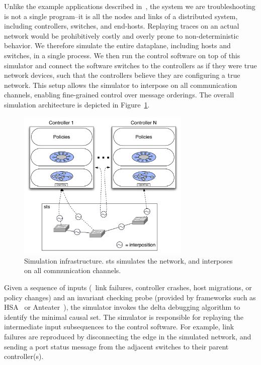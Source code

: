 Unlike the example applications described
in~\cite{Zeller:2002:SIF:506201.506206}, the system we are troubleshooting is not a
single program--it is all the nodes and links of a distributed system,
including controllers, switches, and end-hosts. Replaying traces
on an actual network would be prohibitively costly and overly prone to
non-deterministic behavior. We therefore simulate the entire dataplane, including hosts and
switches, in a single process. We then run the control software on
top of this simulator and connect the software switches to the controllers as if they were true
network devices, such that the controllers believe they are configuring a true
network. This setup allows the simulator to interpose on all communication
channels, enabling fine-grained control over message orderings. The overall
simulation architecture is depicted in
Figure~\ref{fig:architecture}.

\begin{figure}[t]
    \includegraphics[width=3.25in]{../diagrams/architecture/Debugger_Architecture.pdf}
    \caption[]{\label{fig:architecture} Simulation infrastructure. sts
    simulates the network, and interposes on all communication channels.}
\end{figure}

Given a sequence of inputs (\eg~link failures, controller crashes, host migrations,
or policy changes) and an invariant checking probe (provided by frameworks
such as HSA~\cite{hsa} or Anteater~\cite{anteater}), the simulator invokes
the delta debugging algorithm to identify the minimal causal set. The
simulator is responsible for replaying the intermediate input subsequences
to the control software. For example, link failures are
reproduced by disconnecting the edge in the simulated network, and sending a
port status message from the adjacent switches to their parent controller(s).

